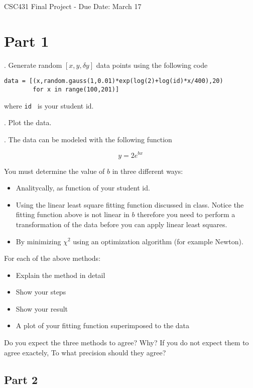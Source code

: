 \documentclass[12pt]{article}
\begin{document}
{\LARGE CSC431 Final Project - Due Date: March 17}

\section{Part 1}

. Generate random $[x,y,\delta y]$ data points using the following code

\begin{verbatim}
data = [(x,random.gauss(1,0.01)*exp(log(2)+log(id)*x/400),20) 
        for x in range(100,201)]
\end{verbatim}

\noindent where {\tt id } is your student id.

. Plot the data.

. The data can be modeled with the following function

\[
y = 2 e^{b x}
\]

\noindent You must determine the value of $b$ in three different ways:

\begin{itemize}
\item Analitycally, as function of your student id.
\item Using the linear least square fitting function discussed in class. Notice the fitting function above is not linear in $b$ therefore you need to perform a transformation of the data before you can apply linear least squares.
\item By minimizing $\chi^2$ using an optimization algorithm (for example Newton).
\end{itemize}

For each of the above methods:
\begin{itemize}
\item Explain the method in detail
\item Show your steps
\item Show your result
\item A plot of your fitting function superimposed to the data
\end{itemize}

\noindent Do you expect the three methods to agree? Why? If you do not expect them to agree exactely, To what precision should they agree?

\subsection{Part 2}
\end{document}
